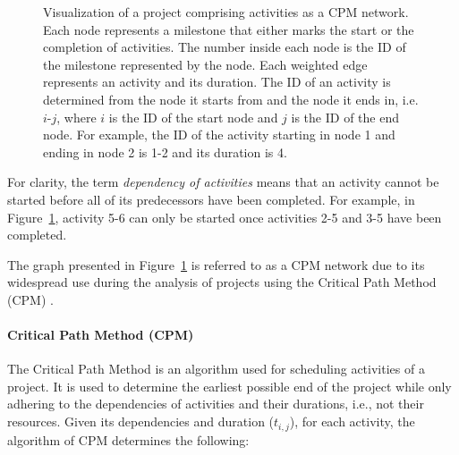 \begin{figure}[ht!]
	\centering
	\caption{Visualization of a project comprising activities as a CPM network.
		Each node represents a milestone that either marks the start or the completion of activities.
		The number inside each node is the ID of the milestone represented by the node.
		Each weighted edge represents an activity and its duration.
		The ID of an activity is determined from the node it starts from and the node it ends in, i.e. $i$-$j$, where $i$ is the ID of the start node and $j$ is the ID of the end node.
		For example, the ID of the activity starting in node 1 and ending in node 2 is 1-2 and its duration is 4.
	}
	\label{Figure:theory->problem->cpm-network-example}
\end{figure}

For clarity, the term \textit{dependency of activities} means that an activity cannot be started before all of its predecessors have been completed. For example, in Figure~\ref{Figure:theory->problem->cpm-network-example}, activity 5-6 can only be started once activities 2-5 and 3-5 have been completed.

The graph presented in Figure~\ref{Figure:theory->problem->cpm-network-example} is referred to as a CPM network due to its widespread use during the analysis of projects using the Critical Path Method (CPM) \cite{Kelley1959}.

\paragraph{Critical Path Method (CPM)}
The Critical Path Method is an algorithm used for scheduling activities of a project.
It is used to determine the earliest possible end of the project while only adhering to the dependencies of activities and their durations, i.e., not their resources.
Given its dependencies and duration ($t_{i, j}$), for each activity, the algorithm of CPM determines the following: 

